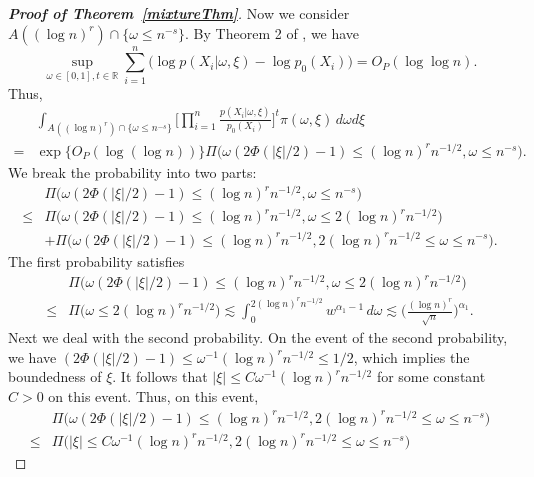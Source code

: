 \documentclass[11pt]{article}
\theoremstyle{plain}
\theoremstyle{definition}
\theoremstyle{remark}
\begin{document}
\begin{appendices}
\begin{proof}[\textbf{Proof of Theorem~\ref{mixtureThm}}]
Now we consider $A((\log n)^r)\cap \{\omega\leq n^{-s}\} $. By Theorem 2 of \cite{LIU200461}, we have 
\begin{equation*}
    \sup_{\omega\in [0,1],t\in \mathbb{R}}
    \sum_{i=1}^n \big(\log p(X_i|\omega,\xi)-\log p_0(X_i)\big)
    =O_P(\log \log n).
\end{equation*}
Thus,
\begin{align*}
    & \int_{A( (\log n)^r )\cap \{\omega\leq n^{-s}\}} \Big[\prod_{i=1}^n \frac{p(X_i|\omega,\xi)}{p_0(X_i)}\Big]^t \pi(\omega,\xi)\, d\omega d\xi
    \\
    =&\exp\big\{O_P(\log(\log n))\big\}
    \Pi\big(\omega(2\Phi(|\xi|/2)-1)\leq (\log n)^r n^{-1/2}, \omega\leq n^{-s}\big).
\end{align*}
We break the probability into two parts: 
\begin{align*}
    &\Pi\big(\omega(2\Phi(|\xi|/2)-1)\leq (\log n)^r n^{-1/2}, \omega\leq n^{-s}\big)
    \\
    \leq &
    \Pi\big(\omega(2\Phi(|\xi|/2)-1)\leq (\log n)^r n^{-1/2}, \omega\leq  2(\log n)^r n^{-1/2}\big)
    \\
    &
    +
    \Pi\big(\omega(2\Phi(|\xi|/2)-1)\leq (\log n)^r n^{-1/2},   2(\log n)^r n^{-1/2} \leq \omega\leq n^{-s}\big)
    .
\end{align*}
The first probability satisfies
\begin{align*}
    &\Pi\big(\omega(2\Phi(|\xi|/2)-1)\leq (\log n)^r n^{-1/2}, \omega\leq  2(\log n)^r n^{-1/2}\big)
    \\
    \leq &
    \Pi\big( \omega\leq  2(\log n)^r n^{-1/2}\big)
    \lesssim 
    \int_{0}^{2(\log n)^r n^{-1/2}} w^{\alpha_1-1}\, d\omega
    \lesssim \Big(\frac{(\log n)^r}{\sqrt{n}}\Big)^{\alpha_1}.
\end{align*}
Next we deal with the second probability.
On the event of the second probability, we have
$
    (2\Phi(|\xi|/2)-1)\leq \omega^{-1} (\log n)^r n^{-1/2}\leq 1/2
    $,
which implies the boundedness of $\xi$.
It follows that
$
|\xi|\leq C\omega^{-1} (\log n)^r n^{-1/2}
$
for some constant $C>0$ on this event.
Thus, on this event,
\begin{align*}
    &\Pi\big(\omega(2\Phi(|\xi|/2)-1)\leq (\log n)^r n^{-1/2},   2(\log n)^r n^{-1/2} \leq \omega\leq n^{-s}\big)
    \\
    \leq
    &\Pi\big(|\xi|\leq C \omega^{-1} (\log n)^r n^{-1/2},   2(\log n)^r n^{-1/2} \leq \omega\leq n^{-s}\big)

\end{align*}
\end{proof}
\end{appendices}
\end{document}
